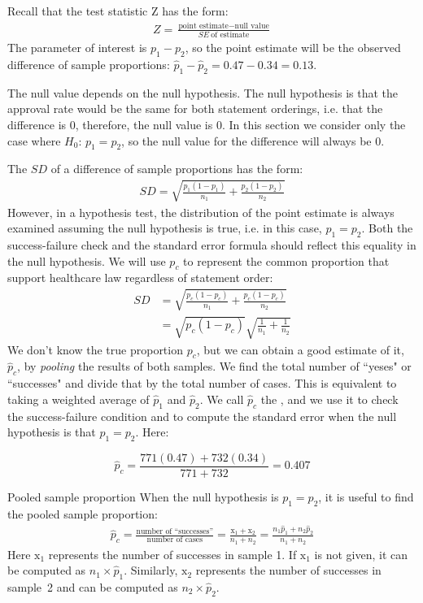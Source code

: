 Recall that the test statistic Z has the form:
\begin{align*}
Z = \frac{\text{point estimate} - \text{null value}}{SE\ \text{of estimate}}
\end{align*}
The parameter of interest is $p_1-p_2$, so the point estimate will be the observed difference of sample proportions:  $\hat{p}_{1} - \hat{p}_{2} = 0.47 - 0.34 = 0.13$.  

The null value depends on the null hypothesis.  The null hypothesis is that the approval rate would be the same for both statement orderings, i.e. that the difference is 0, therefore, the null value is 0.  In this section we consider only the case where $H_0$: $p_1=p_2$, so the null value for the difference will always be 0.

The $SD$ of a difference of sample proportions has the form:
\begin{align*}
SD = \sqrt{\frac{p_1(1-p_1)}{n_1} + \frac{p_2(1-p_2)}{n_2}}
\end{align*}
However, in a hypothesis test, the distribution of the point estimate is always examined assuming the null hypothesis is true, i.e. in this case, $p_1 = p_2$. Both the success-failure check and the standard error formula should reflect this equality in the null hypothesis. We will use $p_c$ to represent the common proportion that support healthcare law regardless of statement order:
\begin{align*}
SD &= \sqrt{\frac{p_c(1-p_c)}{n_1} + \frac{p_c(1-p_c)}{n_2}} \\
	&= \sqrt{p_c(1-p_c)}\sqrt{\frac{1}{n_1} + \frac{1}{n_2}}
\end{align*}
We don't know the true proportion $p_c$, but we can obtain a good estimate of it, $\hat{p}_c$, by \emph{pooling} the results of both samples.  We find the total number of ``yeses" or ``successes" and divide that by the total number of cases.  This is equivalent to taking a weighted average of $\hat{p}_1$ and $\hat{p}_2$.  We call $\hat{p}_c$ the , and we use it to check the success-failure condition and to compute the standard error when the null hypothesis is that $p_1 = p_2$.  Here:

$$\hat{p}_c =  \frac{771(0.47) + 732(0.34)}{771+732}= 0.407$$

\begin{onebox}{Pooled sample proportion}
When the null hypothesis is $p_1 = p_2$, it is useful to find the pooled sample proportion:
\begin{eqnarray*}
\hat{p}_c = \frac{\text{number of ``successes''}}{\text{number of cases}} = \frac{\text{x}_1+\text{x}_2}{n_1+n_2}=\frac{n_1\hat{p}_1 + n_2\hat{p}_2}{n_1 + n_2}
\end{eqnarray*}
Here $\text{x}_1$ represents the number of successes in sample 1. If $\text{x}_1$ is not given, it can be computed as $n_1\times \hat{p}_1$. Similarly, $\text{x}_2$ represents the number of successes in sample~2 and can be computed as $n_2\times \hat{p}_2$.
\end{onebox}


